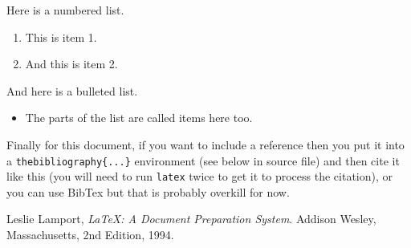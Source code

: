 \documentclass[a4wide, 11pt]{article}
\begin{document}
Here is a numbered list.

\begin{enumerate}

    \item
    This is item 1.
    
    \item
    And this is item 2.
    
\end{enumerate}

And here is a bulleted list.

\begin{itemize}

    \item
    The parts of the list are called items here too.
    
\end{itemize}

Finally for this document, if you want to include a reference
then you put it into a \texttt{thebibliography\{...\}}
environment (see below in source file) and then 
cite it like this \cite{lamport94}
(you will need to run \texttt{latex} twice to get it to process the citation),
or you can use BibTex but that is probably overkill for now.

\begin{thebibliography}{9}

  Leslie Lamport,
  \emph{\LaTeX: A Document Preparation System}.
  Addison Wesley, Massachusetts,
  2nd Edition,
  1994.

\end{thebibliography}
\end{document}
